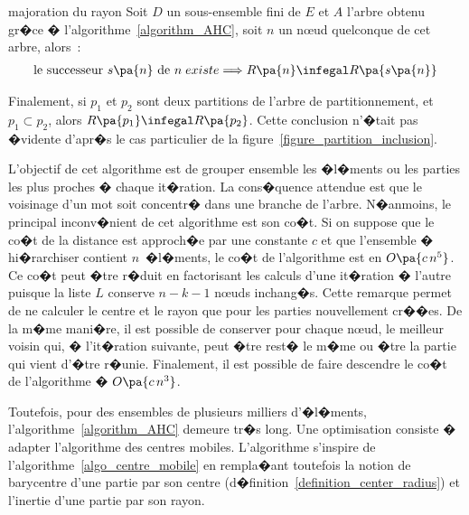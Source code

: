             \begin{xcorollary}{majoration du rayon}\label{corollary_AHC}%
            Soit $D$ un sous-ensemble fini de $E$ et $A$ l'arbre obtenu gr�ce � l'algorithme~\ref{algorithm_AHC}, 
            soit $n$ un n\oe ud quelconque de cet arbre, alors~:
                \begin{eqnarray}
                \textnormal{le successeur } s\pa{n} \text { de } n\; { existe} 
                \Longrightarrow R\pa{n} \infegal R\pa{s\pa{n}}
                \end{eqnarray}
            \end{xcorollary}


Finalement, si $p_1$ et $p_2$ sont deux partitions de l'arbre de partitionnement, et $p_1 \subset p_2$, alors
$R\pa{p_1} \infegal R\pa{p_2}$. Cette conclusion n'�tait pas �vidente d'apr�s le cas particulier de la figure~\ref{figure_partition_inclusion}. 





L'objectif de cet algorithme est de grouper ensemble les �l�ments ou les parties les plus proches � chaque it�ration. La cons�quence attendue est que le voisinage d'un mot soit concentr� dans une branche de l'arbre. N�anmoins, le principal inconv�nient de cet algorithme est son co�t. Si on suppose que le co�t de la distance est approch�e par une constante $c$ et que l'ensemble � hi�rarchiser contient $n$~�l�ments, le co�t de l'algorithme est en $O\pa{c\,n^5}$. Ce co�t peut �tre r�duit en factorisant les calculs d'une it�ration � l'autre puisque la liste $L$ conserve $n-k-1$ n\oe uds inchang�s. Cette remarque permet de ne calculer le centre et le rayon que pour les parties nouvellement cr��es. De la m�me mani�re, il est possible de conserver pour chaque n\oe ud, le meilleur voisin qui, � l'it�ration suivante, peut �tre rest� le m�me ou �tre la partie qui vient d'�tre r�unie. Finalement, il est possible de faire descendre le co�t de l'algorithme � $O\pa{c \, n^3}$.

Toutefois, pour des ensembles de plusieurs milliers d'�l�ments, l'algorithme~\ref{algorithm_AHC} demeure tr�s long. Une optimisation consiste � adapter l'algorithme des centres mobiles. L'algorithme s'inspire de l'algorithme~\ref{algo_centre_mobile} en rempla�ant toutefois la notion de barycentre d'une partie par son centre (d�finition~\ref{definition_center_radius}) et l'inertie d'une partie par son rayon.


